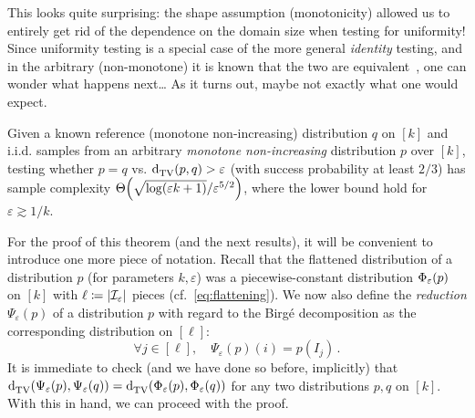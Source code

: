 \documentclass[11pt]{article}
\newcommand{\birgered}[2][\D]{\Psi_{#2}(#1)}
\newcommand{\dst}{\varepsilon}
\newcommand{\ab}{k}
\renewcommand{\eqdef}{\coloneqq}
\newcommand{\p}{p}
\newcommand{\q}{q}
\begin{document}
This looks quite surprising: the shape assumption (monotonicity) allowed us to entirely get rid of the dependence on the domain size when testing for uniformity! Since uniformity testing is a special case of the more general \emph{identity} testing, and in the arbitrary (non-monotone) it is known that the two are equivalent~\cite{DK:16,Goldreich:16,ACT:19}, one can wonder what happens next\dots{} As it turns out, maybe not exactly what one would expect.
\begin{theorem}\label{theo:testing:identity:monotone}
  Given a known reference (monotone non-increasing) distribution $\q$ on $[\ab]$ and i.i.d. samples from an arbitrary \emph{monotone non-increasing} distribution $\p$ over $[\ab]$, testing whether $\p=\q$ vs. $\totalvardist{\p}{\q} > \dst$ (with success probability at least $2/3$) has sample complexity $\bigTheta{\sqrt{\log(\dst\ab + 1)}/\dst^{5/2}}$, where the lower bound hold for $\dst \gtrsim 1/\ab$.
\end{theorem}
For the proof of this theorem (and the next results), it will be convenient to introduce one more piece of notation. Recall that the flattened distribution of a distribution $\p$ (for parameters $\ab,\dst$) was a piecewise-constant distribution $\birge[\p]{\dst}$ on $[\ab]$ with $\ell\eqdef \abs{\mathcal{I}_\dst}$ pieces (cf.~\eqref{eq:flattening}). We now also define the \emph{reduction} $\birgered[\p]{\dst}$ of a distribution $\p$ with regard to the Birg\'e decomposition as the corresponding distribution on $[\ell]$:
\begin{equation}\label{eq:reducing}
    \forall j\in [\ell],\quad \birgered[\p]{\dst}(i) = \p(I_j)\,.
\end{equation}
It is immediate to check (and we have done so before, implicitly) that $\totalvardist{\birgered[\p]{\dst}}{\birgered[\q]{\dst}} = \totalvardist{\birge[\p]{\dst}}{\birge[\q]{\dst}}$ for any two distributions $\p,\q$ on $[\ab]$.
With this in hand, we can proceed with the proof.
\end{document}
